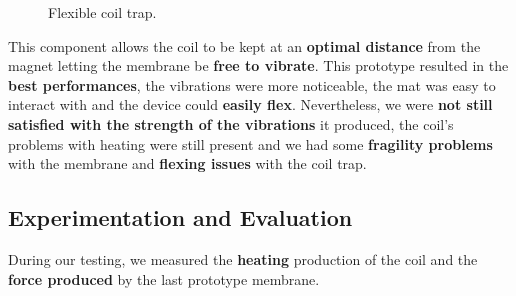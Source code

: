 \newsavebox{\bigimage}
\begin{figure}[H]
    \centering
    \begin{subcaptiongroup}
        \centering
        \parbox[b]{0.2\textwidth}{
            \centering
        }
        \parbox[b]{0.2\textwidth}{
            \centering
            \usebox{
                \bigimage
            }
        }
        
    \end{subcaptiongroup}
    \caption{Flexible coil trap.}
\end{figure}

This component allows the coil to be kept at an \textbf{optimal distance} from the magnet letting the membrane be \textbf{free to vibrate}.
This prototype resulted in the \textbf{best performances}, the vibrations were more noticeable, the mat was easy to interact with and the device could \textbf{easily flex}.
Nevertheless, we were \textbf{not still satisfied with the strength of the vibrations} it produced, the coil's problems with heating were still present and we had some \textbf{fragility problems} with the membrane and \textbf{flexing issues} with the coil trap. 

\subsection{Experimentation and Evaluation}
During our testing, we measured the \textbf{heating} production of the coil and the \textbf{force produced} by the last prototype membrane.
